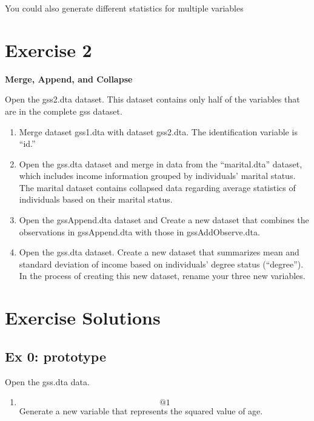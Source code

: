 \documentclass[]{book}
\providecommand{\tightlist}{%
  \setlength{\itemsep}{0pt}\setlength{\parskip}{0pt}}
\begin{document}
You could also generate different statistics for multiple variables

\section{Exercise 2}\label{exercise-2-3}

\textbf{Merge, Append, and Collapse}

Open the gss2.dta dataset. This dataset contains only half of the
variables that are in the complete gss dataset.

\begin{enumerate}
\def\labelenumi{\arabic{enumi}.}
\tightlist
\item
  Merge dataset gss1.dta with dataset gss2.dta. The identification
  variable is ``id.''
\item
  Open the gss.dta dataset and merge in data from the ``marital.dta''
  dataset, which includes income information grouped by individuals'
  marital status. The marital dataset contains collapsed data regarding
  average statistics of individuals based on their marital status.
\item
  Open the gssAppend.dta dataset and Create a new dataset that combines
  the observations in gssAppend.dta with those in gssAddObserve.dta.
\item
  Open the gss.dta dataset. Create a new dataset that summarizes mean
  and standard deviation of income based on individuals' degree status
  (``degree''). In the process of creating this new dataset, rename your
  three new variables.
\end{enumerate}

\section{Exercise Solutions}\label{exercise-solutions-4}

\subsection{Ex 0: prototype}\label{ex-0-prototype-4}

Open the gss.dta data.

\begin{enumerate}
\def\labelenumi{\arabic{enumi}.}
\tightlist
\item
  \[@1\] Generate a new variable that represents the squared value of
  age.
\end{enumerate}
\end{document}
